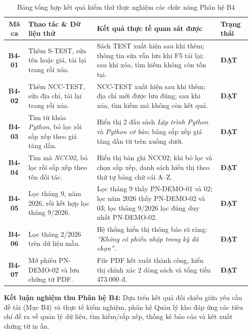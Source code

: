 \documentclass[12pt,a4paper]{article}
\begin{document}
\begin{table}[H]
\centering
\small
\renewcommand{\arraystretch}{1.3}
\begin{tabularx}{\textwidth}{|c|>{\raggedright\arraybackslash}p{3.8cm}|>{\raggedright\arraybackslash}X|>{\centering\arraybackslash}p{2.0cm}|}
\hline
\textbf{Mã ca} & \textbf{Thao tác \& Dữ liệu thử} & \textbf{Kết quả thực tế quan sát được} & \textbf{Trạng thái} \\
\hline
\textbf{B4-01} & Thêm S-TEST, sửa tên hoặc giá, tải lại trang rồi xóa. & Sách TEST xuất hiện sau khi thêm; thông tin sửa vẫn lưu khi F5 tải lại; sau khi xóa, tìm kiếm không còn tồn tại. & \textbf{ĐẠT} \\
\hline
\textbf{B4-02} & Thêm NCC-TEST, sửa địa chỉ, tải lại trang rồi xóa. & NCC-TEST xuất hiện sau khi thêm; địa chỉ mới được lưu đúng; sau khi xóa, tìm kiếm mã không còn kết quả. & \textbf{ĐẠT} \\
\hline
\textbf{B4-03} & Tìm từ khóa \textit{Python}, bỏ lọc rồi sắp xếp theo giá tăng dần. & Hiển thị 2 đầu sách \textit{Lập trình Python} và \textit{Python cơ bản}; bảng sắp xếp giá tăng dần từ trên xuống dưới. & \textbf{ĐẠT} \\
\hline
\textbf{B4-04} & Tìm mã \textit{NCC02}, bỏ lọc rồi sắp xếp theo tên đối tác. & Hiển thị bản ghi NCC02; khi bỏ lọc và chọn sắp xếp, danh sách hiển thị theo thứ tự bảng chữ cái A--Z. & \textbf{ĐẠT} \\
\hline
\textbf{B4-05} & Lọc tháng 9, năm 2026, rồi kết hợp lọc tháng 9/2026. & Lọc tháng 9 thấy PN-DEMO-01 và 02; lọc năm 2026 thấy PN-DEMO-02 và 03; lọc tháng 9/2026 lọc đúng duy nhất PN-DEMO-02. & \textbf{ĐẠT} \\
\hline
\textbf{B4-06} & Lọc tháng 2/2026 trên dữ liệu mẫu. & Hệ thống hiển thị thông báo rõ ràng: \textit{''Không có phiếu nhập trong kỳ đã chọn''}. & \textbf{ĐẠT} \\
\hline
\textbf{B4-07} & Mở phiếu PN-DEMO-02 và lưu chứng từ PDF. & File PDF kết xuất thành công, hiển thị chính xác 2 dòng sách và tổng tiền 473.000 đ. & \textbf{ĐẠT} \\
\hline
\end{tabularx}
\caption{Bảng tổng hợp kết quả kiểm thử thực nghiệm các chức năng Phân hệ B4}
\label{tab:b4-kiem-thu}
\end{table}

\noindent\textbf{Kết luận nghiệm thu Phân hệ B4:} Dựa trên kết quả đối chiếu giữa yêu cầu đề tài (Mục B4) và thực tế kiểm nghiệm, phân hệ Quản lý kho đáp ứng các tiêu chí đề ra về quản lý dữ liệu, tìm kiếm/sắp xếp, thống kê báo cáo và kết xuất chứng từ in ấn.
\end{document}
